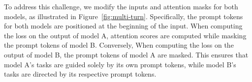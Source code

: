 To address this challenge, we modify the inputs and attention masks for both models, as illustrated in Figure~\ref{fig:multi-turn}. Specifically, the prompt tokens for both models are positioned at the beginning of the input. When computing the loss on the output of model A, attention scores are computed while masking the prompt tokens of model B. Conversely, When computing the loss on the output of model B, the prompt tokens of model A are masked. This ensures that model A's tasks are guided solely by its own prompt tokens, while model B's tasks are directed by its respective prompt tokens.

